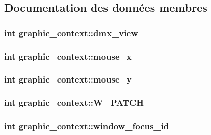 \subsection{Documentation des données membres}
\hypertarget{classgraphic__context_abeabd1716cb7451605935b9191be65fb}{
\subsubsection[{dmx\+\_\+view}]{\setlength{\rightskip}{0pt plus 5cm}int graphic\+\_\+context\+::dmx\+\_\+view}}\label{classgraphic__context_abeabd1716cb7451605935b9191be65fb}
\hypertarget{classgraphic__context_af9aa907f4c540927888920111f2a3890}{
\subsubsection[{mouse\+\_\+x}]{\setlength{\rightskip}{0pt plus 5cm}int graphic\+\_\+context\+::mouse\+\_\+x}}\label{classgraphic__context_af9aa907f4c540927888920111f2a3890}
\hypertarget{classgraphic__context_a72195ff30744dcb9c467cad5bda4e602}{
\subsubsection[{mouse\+\_\+y}]{\setlength{\rightskip}{0pt plus 5cm}int graphic\+\_\+context\+::mouse\+\_\+y}}\label{classgraphic__context_a72195ff30744dcb9c467cad5bda4e602}
\hypertarget{classgraphic__context_af8795c6d73bb4076febf90a4bed34cd7}{
\subsubsection[{W\+\_\+\+P\+A\+T\+C\+H}]{\setlength{\rightskip}{0pt plus 5cm}int graphic\+\_\+context\+::\+W\+\_\+\+P\+A\+T\+C\+H}}\label{classgraphic__context_af8795c6d73bb4076febf90a4bed34cd7}
\hypertarget{classgraphic__context_afb842574bef9200a343eae5ed25b6aea}{
\subsubsection[{window\+\_\+focus\+\_\+id}]{\setlength{\rightskip}{0pt plus 5cm}int graphic\+\_\+context\+::window\+\_\+focus\+\_\+id}}\label{classgraphic__context_afb842574bef9200a343eae5ed25b6aea}
